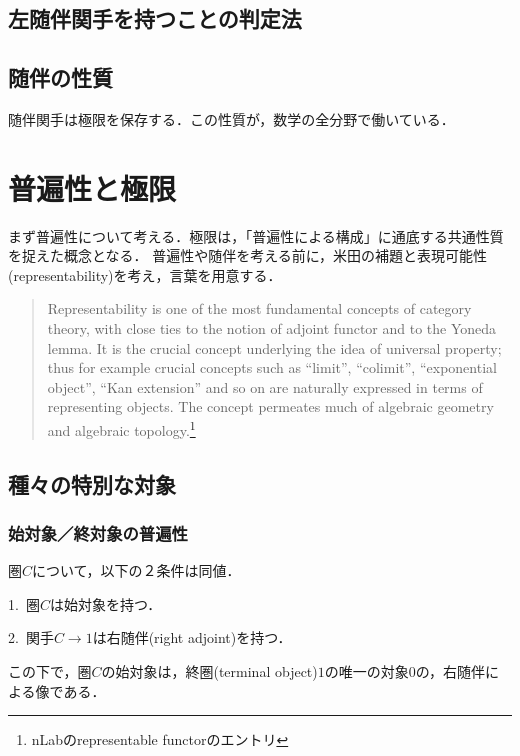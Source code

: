 \documentclass[uplatex, dvipdfmx]{jsreport}
\begin{document}
\section{左随伴関手を持つことの判定法}

\section{随伴の性質}

\begin{screen}
    随伴関手は極限を保存する．この性質が，数学の全分野で働いている．
\end{screen}

\chapter{普遍性と極限}
まず普遍性について考える．極限は，「普遍性による構成」に通底する共通性質を捉えた概念となる．
普遍性や随伴を考える前に，米田の補題と表現可能性(representability)を考え，言葉を用意する．
\begin{quotation}
    Representability is one of the most fundamental concepts of category theory, with close ties to the notion of adjoint functor and to the Yoneda lemma.
    It is the crucial concept underlying the idea of universal property; thus for example crucial concepts such as “limit”, “colimit”, “exponential object”, “Kan extension” and so on are naturally expressed in terms of representing objects.
    The concept permeates much of algebraic geometry and algebraic topology.\footnote{nLabのrepresentable functorのエントリ}
\end{quotation}


\section{種々の特別な対象}

\subsection{始対象／終対象の普遍性}

\begin{proposition}[始対象を持つ圏の特徴付け]\rm{}
    圏$C$について，以下の２条件は同値．
    
    1.\, 圏$C$は始対象を持つ．

    2.\, 関手$C\to 1$は右随伴(right adjoint)を持つ．
\end{proposition}
この下で，圏$C$の始対象は，終圏(terminal object)$1$の唯一の対象$0$の，右随伴による像である．
\end{document}
